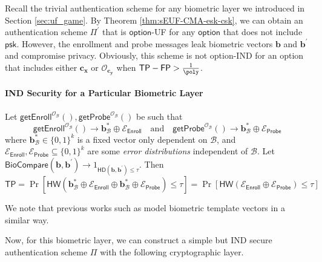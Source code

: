Recall the trivial authentication scheme for any biometric layer we introduced in Section \ref{sec:uf_game}. By Theorem \ref{thm:sEUF-CMA-esk-csk}, we can obtain an authentication scheme $\Pi^\prime$ that is $\mathsf{option}$-UF for any $\mathsf{option}$ that does not include $\textsf{psk}$.
However, the enrollment and probe messages leak biometric vectors $\mathbf{b}$ and $\mathbf{b}^\prime$ and compromise privacy. Obviously, this scheme is not \textsf{option}-IND for an \textsf{option} that includes either $\mathbf{c_x}$ or $\mathcal{O}_{\mathbf{c_y}}$ when $\mathsf{TP} - \mathsf{FP} > \frac{1}{\poly}$.

\paragraph{IND Security for a Particular Biometric Layer}

Let $\mathsf{getEnroll}^{\mathcal{O}_{\mathcal{B}}}(), \textsf{getProbe}^{\mathcal{O}_{\mathcal{B}}}()$ be such that
\[
	\textsf{getEnroll}^{\mathcal{O}_{\mathcal{B}}}() \to \mathbf{b}^*_{\mathcal{B}} \oplus \mathcal{E}_{\textsf{Enroll}}  \quad \text{and} \quad \textsf{getProbe}^{\mathcal{O}_{\mathcal{B}}}() \to \mathbf{b}^*_{\mathcal{B}} \oplus \mathcal{E}_{\textsf{Probe}}
\]
where $\mathbf{b}^*_{\mathcal{B}} \in \{0, 1\}^k$ is a fixed vector only dependent on $\mathcal{B}$, and $\mathcal{E}_{\mathsf{Enroll}}, \mathcal{E}_{\mathsf{Probe}} \subseteq \{0, 1\}^k$ are some \emph{error distributions} independent of $\mathcal{B}$. Let $\mathsf{BioCompare}(\mathbf{b}, \mathbf{b}^\prime) \to 1_{\mathsf{HD}(\mathbf{b}, \mathbf{b}^\prime) \leq \tau}$. Then
\[
	\textsf{TP} = \Pr[ \textsf{HW}(\mathbf{b}^*_{\mathcal{B}} \oplus \mathcal{E}_{\textsf{Enroll}} \oplus \mathbf{b}^*_{\mathcal{B}} \oplus \mathcal{E}_{\textsf{Probe}}) \leq \tau ] = \Pr[ \textsf{HW}(\mathcal{E}_{\textsf{Enroll}} \oplus \mathcal{E}_{\textsf{Probe}}) \leq \tau ]
\]

\noindent We note that previous works such as \cite{10.1145/1030083.1030096,cryptoeprint:2014/394} model biometric template vectors in a similar way.

Now, for this biometric layer, we can construct a simple but IND secure authentication scheme $\Pi$ with the following cryptographic layer.

